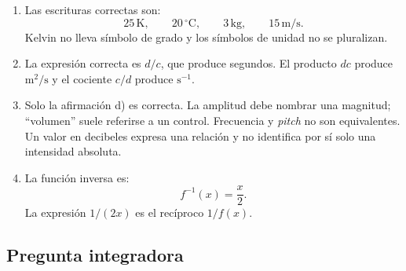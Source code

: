 \begin{enumerate}[label=\textbf{D\arabic*.},leftmargin=*]
    \item Las escrituras correctas son:
    \[
        25\,\text{K},
        \qquad
        20\,^{\circ}\text{C},
        \qquad
        3\,\text{kg},
        \qquad
        15\,\text{m}/\text{s}.
    \]
    Kelvin no lleva símbolo de grado y los símbolos de unidad no se pluralizan.

    \item La expresión correcta es \(d/c\), que produce segundos. El producto \(dc\) produce \(\text{m}^{2}/\text{s}\) y el cociente \(c/d\) produce \(\text{s}^{-1}\).

    \item Solo la afirmación d) es correcta. La amplitud debe nombrar una magnitud; ``volumen'' suele referirse a un control. Frecuencia y \emph{pitch} no son equivalentes. Un valor en decibeles expresa una relación y no identifica por sí solo una intensidad absoluta.

    \item La función inversa es:
    \[
        f^{-1}(x)=\frac{x}{2}.
    \]
    La expresión \(1/(2x)\) es el recíproco \(1/f(x)\).
\end{enumerate}

\subsection*{Pregunta integradora}

